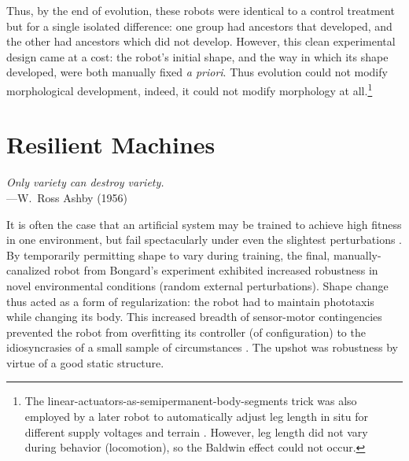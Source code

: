 Thus, by the end of evolution, these robots were identical to a control treatment but for a single isolated difference: one group had ancestors that developed, and the other had ancestors which did not develop.
However, this clean experimental design came at a cost: the robot's initial shape, and the way in which its shape developed, were both manually fixed \textit{a priori}. 
Thus evolution could not modify morphological development, indeed, it could not modify morphology at all.\footnote{%
The linear-actuators-as-semipermanent-body-segments trick
was also employed by a 
later robot to automatically adjust leg length in situ for different supply voltages \cite{nygaard2018real} and terrain
\cite{nygaard2020environmental}.
However, leg length did not vary during behavior (locomotion), so the Baldwin effect could not occur.
}



\section{Resilient Machines}


\begin{changemargin}{4em}{4em} 

\vspace{1em}

    \textit{Only variety can destroy variety.} \\[4pt]
    \hspace*{16.5em} ---W.~Ross Ashby (1956)
    
\vspace{1em}
    
    
\end{changemargin}


\noindent
It is often the case that an artificial system may be trained to achieve high fitness in one environment, but fail spectacularly under even the slightest perturbations \cite{athalye2018synthesizing,carlson2005ugvs}.
By temporarily permitting shape to vary during training, the final, manually-canalized robot from  Bongard's experiment \cite{bongard2011morphological}
exhibited increased robustness in novel environmental conditions (random external perturbations).
Shape change thus acted as a form of regularization: 
the robot had to maintain phototaxis while changing its body.
This increased breadth of sensor-motor contingencies prevented the robot from overfitting its controller (of configuration) to the idiosyncrasies of a small sample of circumstances \cite{jakobi1995noise}.
The upshot was robustness by virtue of a good static structure.

